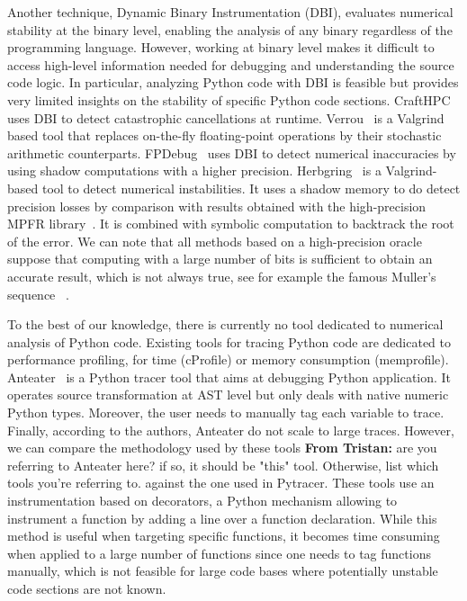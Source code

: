 \documentclass[11pt]{article}
\newcommand{\tristan}[1]{\color{orange}\textbf{From Tristan:} #1\color{black}\xspace}
\begin{document}
Another technique, Dynamic Binary Instrumentation (DBI), evaluates numerical stability at the binary level,
enabling the analysis of any binary regardless of the programming language. However, working at binary level makes it difficult to access high-level information needed
for debugging and understanding the source code logic. In particular, analyzing Python code with DBI is feasible but provides very limited insights on the stability of specific Python code sections.
CraftHPC~\cite{lam2013dynamic} uses DBI to detect catastrophic cancellations at runtime.
Verrou~\cite{fevotte2016verrou} is a Valgrind~\cite{nethercote2007valgrind} based tool that replaces on-the-fly
floating-point operations by their stochastic arithmetic counterparts. FPDebug~\cite{benz2012dynamic} uses DBI to detect numerical 
inaccuracies by using shadow computations with a higher precision.
Herbgring~\cite{sanchez2017finding} is a Valgrind-based tool to detect
numerical instabilities. It uses a shadow memory to do detect precision losses by comparison with results obtained with the high-precision 
MPFR library~\cite{fousse2007mpfr}. It is combined with symbolic computation to backtrack the root of the error.
We can note that all methods based on a high-precision oracle suppose that computing with
a large number of bits is sufficient to obtain an accurate result, which is not always true, see for example the famous Muller's sequence ~\cite{chatelain2018veritracer}.

To the best of our knowledge, there is currently no tool dedicated to numerical analysis of Python code. Existing tools for tracing Python code are dedicated to performance profiling, for time (cProfile) 
or memory consumption (memprofile). 
Anteater~\cite{faust2019anteater} is a Python tracer tool that aims at debugging Python application. 
It operates source transformation at AST level but only deals with native numeric Python types.
Moreover, the user needs to manually tag each variable to trace. Finally, according to the authors,
Anteater do not scale to large traces.
However, we can compare the methodology used by these tools \tristan{are you referring to Anteater here? if so, it should be "this" tool. Otherwise, list which tools you're referring to.} against the one used in Pytracer.
These tools use an instrumentation based on decorators, a Python mechanism allowing 
to instrument a function by adding a line over a function declaration.
While this method is useful when targeting specific functions, it becomes time consuming 
when applied to a large number of functions since one needs to tag functions manually,
which is not feasible for large code bases where potentially unstable code sections are not known.
\end{document}
